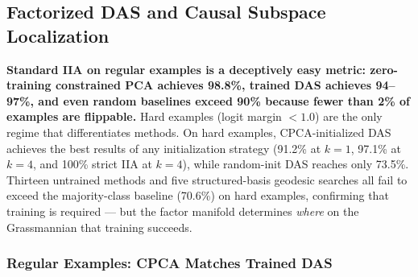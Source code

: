 \documentclass[11pt]{article}
\begin{document}
\subsection{Factorized DAS and Causal Subspace Localization}
\label{sec:factorized-das}



\textbf{Standard IIA on regular examples is a deceptively easy metric:
zero-training constrained PCA achieves 98.8\%, trained DAS achieves
94--97\%, and even random baselines exceed 90\% because fewer than 2\%
of examples are flippable.}
Hard examples (logit margin $< 1.0$) are the only regime that
differentiates methods.
On hard examples, CPCA-initialized DAS achieves the best results of
any initialization strategy (91.2\% at $k=1$, 97.1\% at $k=4$, and
100\% strict IIA at $k=4$), while random-init DAS reaches only 73.5\%.
Thirteen untrained methods and five structured-basis geodesic searches
all fail to exceed the majority-class baseline (70.6\%) on hard examples,
confirming that training is required --- but the factor manifold
determines \emph{where} on the Grassmannian that training succeeds.

\subsubsection{Regular Examples: CPCA Matches Trained DAS}
\end{document}
